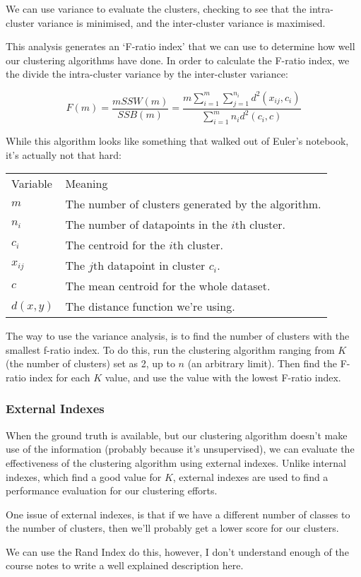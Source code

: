 We can use variance to evaluate the clusters, checking to see that the intra-
cluster variance is minimised, and the inter-cluster variance is maximised.

This analysis generates an `F-ratio index' that we can use to determine how well
our clustering algorithms have done. In order to calculate the F-ratio index, we
the divide the intra-cluster variance by the inter-cluster variance:

\[
  F(m) = \frac{mSSW(m)}{SSB(m)} = \frac{m\sum\limits_{i=1}^m\sum\limits_{j=1}^{n_i}d^2(x_{ij},c_i)}{\sum\limits_{i=1}^mn_id^2(c_i,c)}
\]

While this algorithm looks like something that walked out of Euler's notebook,
it's actually not that hard:

\begin{center}
  \begin{tabular}{ll}
    Variable & Meaning\\
    $m$     & The number of clusters generated by the algorithm.\\
    $n_i$   & The number of datapoints in the $i$th cluster.\\
    $c_i$   & The centroid for the $i$th cluster.\\
    $x_{ij}$& The $j$th datapoint in cluster $c_i$.\\
    $c$     & The mean centroid for the whole dataset.\\
    $d(x,y)$& The distance function we're using.
  \end{tabular}
\end{center}

The way to use the variance analysis, is to find the number of clusters with the
smallest f-ratio index. To do this, run the clustering algorithm ranging from
$K$ (the number of clusters) set as 2, up to $n$ (an arbitrary limit). Then find
the F-ratio index for each $K$ value, and use the value with the lowest F-ratio
index.

\subsubsection{External Indexes}

When the ground truth is available, but our clustering algorithm doesn't make
use of the information (probably because it's unsupervised), we can evaluate the
effectiveness of the clustering algorithm using external indexes. Unlike internal
indexes, which find a good value for $K$, external indexes are used to find a
performance evaluation for our clustering efforts.


One issue of external indexes, is that if we have a different number of classes
to the number of clusters, then we'll probably get a lower score for our
clusters.


We can use the Rand Index do this, however, I don't understand enough of the
course notes to write a well explained description here.
